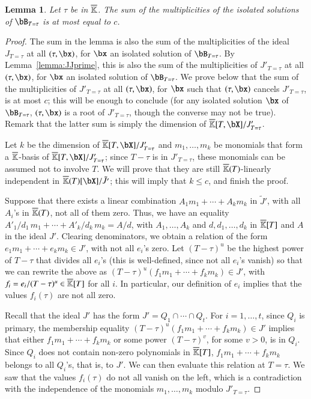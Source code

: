 \documentclass[amsthm]{elsart}
\newtheorem{lemma}[definition]{Lemma}
\begin{document}
 
\begin{lemma}\label{lemma:19}
  Let $\tau$ be in $\overline{\mathbb{K}}$. The sum of the multiplicities of the
  isolated solutions of $\bB_{T=\tau}$ is at most equal to $c$.
\end{lemma}
\begin{proof}
  The sum in the lemma is also the sum of the multiplicities of the
  ideal $J_{T=\tau}$ at all $(\tau,\bx)$, for $\bx$ an isolated solution
  of $\bB_{T=\tau}$.  By Lemma~\ref{lemma:JJprime}, this is also the sum
  of the multiplicities of $J'_{T=\tau}$ at all $(\tau,\bx)$, for $\bx$ an
  isolated solution of $\bB_{T=\tau}$. We prove below that the sum of the
  multiplicities of $J'_{T=\tau}$ at all $(\tau,\bx)$, for $\bx$ such that
  $(\tau,\bx)$ cancels $J'_{T=\tau}$, is at most $c$; this will be enough
  to conclude (for any isolated solution $\bx$ of $\bB_{T=\tau}$,
  $(\tau,\bx)$ is a root of $J'_{T=\tau}$, though the converse may not be
  true). Remark that the latter sum is simply the dimension of
  $\KKbar[T,\bX]/J'_{T=\tau}$.
  
  Let $k$ be the dimension of $\KKbar[T,\bX]/J'_{T=\tau}$ and $m_1,\dots,m_k$ be
  monomials that form a $\overline{\mathbb{K}}$-basis of $\KKbar[T,\bX]/J'_{T=\tau}$; since
  $T-\tau$ is in $J'_{T=\tau}$, these monomials can be assumed not to involve
  $T$. We will prove that they are still $\overline{\mathbb{K}}(T)$-linearly independent in
  $\KKbar(T)[\bX]/\tilde{J'}$; this will imply that $k \le c$, and finish the
  proof.
  
  Suppose that there exists a linear combination $A_1 m_1 + \cdots +
  A_k m_k$ in $\tilde{J}'$, with all $A_i$'s in $\overline{\mathbb{K}}(T)$, not
  all of them zero. Thus, we have an equality $A'_1/d_1\, m_1 + \cdots
  + A'_k/d_k\, m_k = A/d$, with $A_1,\dots,A_k$ and
  $d,d_1,\dots,d_k$ in $\overline{\mathbb{K}}[T]$ and $A$ in the ideal
  $J'$. Clearing denominators, we obtain a relation of the form $e_1
  m_1 +\cdots+ e_k m_k \in J'$, with not all $e_i$'s zero. Let
  $(T-\tau)^u$ be the highest power of $T-\tau$ that divides all
  $e_i$'s (this is well-defined, since not all $e_i$'s vanish) so that
  we can rewrite the above as $(T-\tau)^u (f_1 m_1 +\cdots+ f_k
  m_k) \in J'$, with $f_i=e_i/(T-\tau)^u \in \overline{\mathbb{K}}[T]$ for all $i$.
  In particular, our definition of $e_i$ implies that the values
  $f_i(\tau)$ are not all zero.

  Recall that the ideal $J'$ has the form $J'=Q_1 \cap \cdots \cap
  Q_t$. For $i=1,\dots,t$, since $Q_i$ is primary, the membership
  equality $(T-\tau)^u (f_1 m_1 +\cdots +f_k m_k) \in J'$ implies
  that either $f_1 m_1 +\cdots +f_k m_k$ or some power
  $(T-\tau)^{v}$, for some $v > 0$, is in $Q_i$. Since $Q_i$ does not
  contain non-zero polynomials in $\overline{\mathbb{K}}[T]$, $f_1 m_1 +\cdots+ f_k
  m_k$ belongs to all $Q_i$'s, that is, to $J'$. We can then
  evaluate this relation at $T=\tau$. We saw that the values
  $f_i(\tau)$ do not all vanish on the left, which is a contradiction
  with the independence of the monomials $m_1,\dots,m_k$ modulo
  $J'_{T=\tau}$.
\end{proof}
\end{document}
